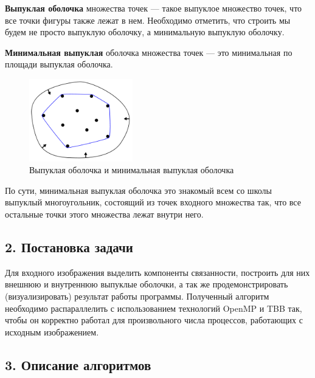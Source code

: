 \documentclass{report}
\begin{document}
\par \textbf{Выпуклая оболочка} множества точек — такое выпуклое множество точек, что все точки фигуры также лежат в нем. Необходимо отметить, что строить мы будем не просто выпуклую оболочку, а минимальную выпуклую оболочку.
\par \textbf{Минимальная выпуклая} оболочка множества точек — это минимальная по площади выпуклая оболочка.
\begin{figure}[htbp]
  \centering
  \includegraphics[width=0.4\textwidth]{2Convex_Hull.png}
  \caption{Выпуклая оболочка и минимальная выпуклая оболочка}\label{fig:2Convex_Hull.png}
\end{figure}
\par По сути, минимальная выпуклая оболочка это знакомый всем со школы выпуклый многоугольник, состоящий из точек входного множества так, что все остальные точки этого множества лежат внутри него.
 
\newpage


\begin{center}
\section*{2. Постановка задачи}
\end{center}
\par Для входного изображения выделить компоненты связанности, построить для них внешнюю и внутреннюю выпуклые оболочки, а так же продемонстрировать (визуализировать) результат работы программы. Полученный алгоритм необходимо распараллелить с использованием технологий OpenMP и TBB так, чтобы он корректно работал для произвольного числа процессов, работающих с исходным изображением.

\newpage


\begin{center}
\section*{3. Описание алгоритмов}
\end{center}
\end{document}
